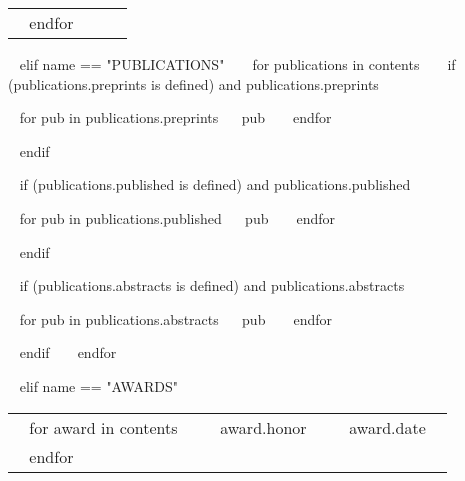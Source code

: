 \begin{minipage}{\textwidth}
\begin{tabular}{ p{} 
                   p{} 
                   p{}}
  ~{ endfor }~
\end{tabular}


%

~{ elif name == "PUBLICATIONS" }~
~{ for publications in contents }~
  ~{ if (publications.preprints is defined) and publications.preprints }~
  \begin{entrylist}[.1]
    ~{ for pub in publications.preprints}~
    \pubentry
      {~{{ pub }}~}
    ~{ endfor }~
  \end{entrylist}
  ~{ endif }~

  ~{ if (publications.published is defined) and publications.published }~
  \begin{entrylist}[.1]
    ~{ for pub in publications.published}~
    \pubentry
      {~{{ pub }}~}
    ~{ endfor }~
  \end{entrylist}
  ~{ endif }~

  ~{ if (publications.abstracts is defined) and publications.abstracts }~
  \begin{entrylist}[.1]
    ~{ for pub in publications.abstracts}~
    \pubentry
      {~{{ pub }}~}
    ~{ endfor }~
  \end{entrylist}
  ~{ endif }~
~{ endfor }~


%

~{ elif name == "AWARDS" }~

\begin{tabular}{ p{} %
                   p{} 
                   p{}} %
  ~{ for award in contents }~
  \small\textcolor{gray}{{\emph{  }}} & ~{{ award.honor }}~ & {\hfill \small{~{{ award.date }}~}}\\
  ~{ endfor }~
\end{tabular}


\end{minipage}

